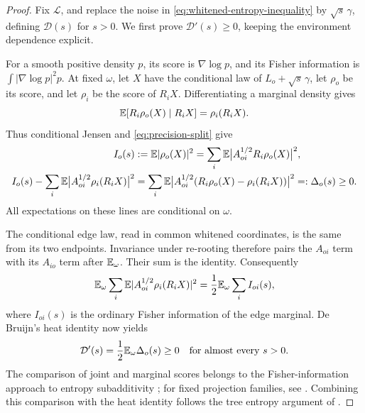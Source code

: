 \begin{proof}
Fix \(\mathcal L\), and replace the noise in
\eqref{eq:whitened-entropy-inequality} by \(\sqrt s\,\gamma\),
defining \(\mathcal D(s)\) for \(s>0\).  We first prove
\(\mathcal D'(s)\ge0\), keeping the environment dependence
explicit.

For a smooth positive density \(p\), its score is
\(\nabla\log p\), and its Fisher information is
\(\int|\nabla\log p|^2p\).  At fixed \(\omega\), let \(X\) have
the conditional law of \(L_o+\sqrt s\,\gamma\), let \(\rho_o\)
be its score, and let \(\rho_i\) be the score of \(R_iX\).
Differentiating a marginal density gives
\[
 \mathbb E[ R_i\rho_o(X)\mid R_iX]=\rho_i(R_iX).
\]
Thus conditional Jensen and \eqref{eq:precision-split} give
\begin{align}
 I_o(s)&:=\mathbb E|\rho_o(X)|^2
   =\sum_i\mathbb E\bigl|A_{oi}^{1/2}R_i\rho_o(X)\bigr|^2,\notag\\
 I_o(s)-\sum_i\mathbb E\bigl|A_{oi}^{1/2}\rho_i(R_iX)\bigr|^2
 &=\sum_i\mathbb E\bigl|A_{oi}^{1/2}
       (R_i\rho_o(X)-\rho_i(R_iX))\bigr|^2
 =:\Delta_o(s)\ge0.\label{eq:score-deficit}
\end{align}
All expectations on these lines are conditional on \(\omega\).

The conditional edge law, read in common whitened coordinates,
is the same from its two endpoints.  Invariance under re-rooting
therefore pairs the \(A_{oi}\) term with its \(A_{io}\) term
after \(\mathbb E_\omega\).  Their sum is the identity.  Consequently
\begin{equation}\label{eq:rerooted-fisher}
 \mathbb E_\omega\sum_i\mathbb E
       |A_{oi}^{1/2}\rho_i(R_iX)|^2
 =\frac12\mathbb E_\omega\sum_i I_{oi}(s),
\end{equation}
where \(I_{oi}(s)\) is the ordinary Fisher information of the
edge marginal.  De Bruijn's heat identity now yields
\begin{equation}\label{eq:heat-deficit}
 \mathcal D'(s)=\frac12\mathbb E_\omega\Delta_o(s)\ge0
 \quad\text{for almost every }s>0.
\end{equation}
The comparison of joint and marginal scores belongs to the
Fisher-information approach to entropy subadditivity
\cite{Carlen1991}; for fixed projection families, see
\cite[Proposition~3.3 and Equation~(3.15)]{CarlenCordero2009}.
Combining this comparison with the heat identity \cite{Stam1959}
follows the tree entropy argument of
\cite[Lemma~11.4 and Proposition~11.1]{BackhauszSzegedy2019}.


\end{proof}
